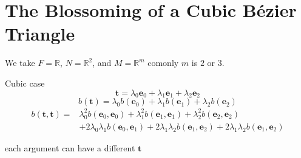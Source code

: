 
\section{The Blossoming of a Cubic Bézier Triangle}
We take $F=\mathbb{R}$, $N=\mathbb{R}^2$, and $M=\mathbb{R}^m$
comonly $m$ is $2$ or $3$.
\begin{center}
\end{center}

Cubic case
\[\mathbf{t} = \lambda_0\mathbf{e}_0+\lambda_1\mathbf{e}_1+\lambda_2\mathbf{e}_2\]
\[b(\mathbf{t}) = \lambda_0b(\mathbf{e}_0)+\lambda_1b(\mathbf{e}_1)+\lambda_2b(\mathbf{e}_2)\]
\[\begin{aligned}
	b(\mathbf{t},\mathbf{t})=& \lambda_0^2b(\mathbf{e}_0,\mathbf{e}_0)+\lambda_1^2b(\mathbf{e}_1,\mathbf{e}_1)+\lambda_2^2b(\mathbf{e}_2,\mathbf{e}_2)\\
	&+2\lambda_0\lambda_1b(\mathbf{e}_0,\mathbf{e}_1)+2\lambda_1\lambda_2b(\mathbf{e}_1,\mathbf{e}_2)+2\lambda_1\lambda_2b(\mathbf{e}_1,\mathbf{e}_2)
\end{aligned}\]

each argument can have a different $\mathbf{t}$

